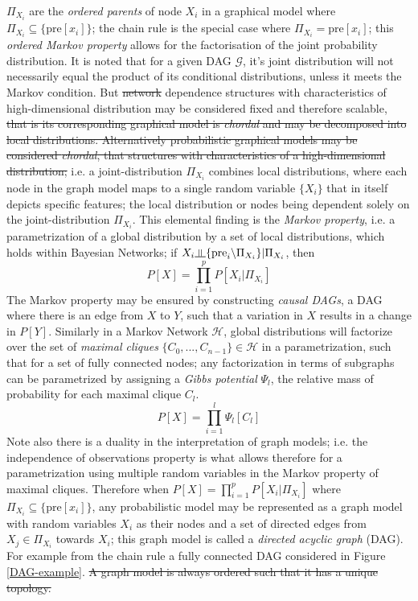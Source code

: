 \documentclass[7pt]{article}
\newcommand{\inperp}{\rotatebox[origin=c]{90}{$\models$}}
\begin{document}
 $\Pi_{X_i}$ are the \emph{ordered parents}  of node $X_i$ in a graphical model where  $\Pi_{X_i} \subseteq \{ \text{pre}[x_i]\}$; the chain rule is the special case where $\Pi_{X_i} = \text{pre}[x_i]$; this \emph{ordered Markov property}  allows for the factorisation of the joint probability distribution.  It is noted that for a given DAG $\mathcal{G}$, it's joint distribution will not necessarily equal the product of its conditional distributions, unless it meets the Markov condition. But \st{network} dependence structures with characteristics of high-dimensional distribution may be considered fixed and therefore scalable,  \st{that is its corresponding graphical model is \emph{chordal} and may be decomposed into local distributions. Alternatively probabilistic graphical models may be considered \emph{chordal}, that  structures with characteristics of a high-dimensional distribution;} i.e. a  joint-distribution $\Pi_{X_i}$ combines local distributions, where each node in the graph model maps to a single random variable $\{X_i\}$ that in itself depicts specific features; the local distribution or nodes being dependent solely on the joint-distribution $\Pi_{X_i}$. This elemental finding is the \emph{Markov property}, i.e. a parametrization of a global distribution by a set of local distributions, which holds within Bayesian Networks; if $X_i \inperp \{ \text{pre}_i \backslash \Pi_{X_i} \} | \Pi_{X_i}$, then  %
	\begin{equation}
		P[X] = \prod_{i=1}^p P[X_i|\Pi_{X_i}]
	\end{equation}
The Markov property may be ensured by constructing \emph{causal DAGs}, a DAG where there is an edge from $X$ to $Y$, such that a variation in $X$ results in a change in $P[Y]$. Similarly in a Markov Network $\mathcal{H} $, global distributions will factorize over the set of \emph{maximal cliques} $\{C_0,...,C_{n-1} \} \in \mathcal{H} $ in a parametrization, such that for a set of fully connected nodes; any factorization in terms of subgraphs can be parametrized by assigning a \emph{Gibbs potential} $\Psi_l$, the relative mass of probability for each maximal clique $C_l$.
\begin{equation}
P[X] = \prod_{i=1}^l \Psi_l[C_l]
\end{equation}
Note also there is a duality in the interpretation of graph models; i.e. the independence of observations property is what allows therefore for a parametrization using multiple random variables in the Markov property of maximal cliques. Therefore when $	P[X] = \prod_{i=1}^p P[X_i|\Pi_{X_i}]$ where $\Pi_{X_i} \subseteq \{ \text{pre}[x_i]\}$, any probabilistic model may be represented as a graph model with  random variables $X_i$ as their nodes and a set of directed edges from $X_j \in \Pi_{X_i}$ towards $X_i$; this graph model is called a \emph{directed acyclic graph} (DAG). For example from the chain rule a fully connected DAG  considered in Figure \ref{DAG-example}. \st{A graph model is always ordered such that it has a unique topology.}
\end{document}
